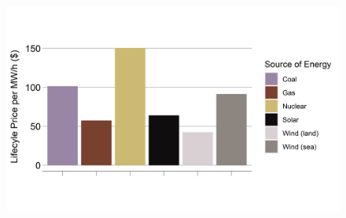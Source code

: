 \documentclass{beamer}
\begin{document}
\begin{frame}{}
\begin{figure}
    \centering
    \includegraphics[width=\textwidth]{../img/Electric.png}
\end{figure}{}
\end{frame}{}
\end{document}
